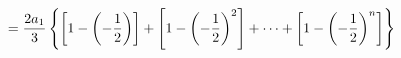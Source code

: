 \documentclass[preview]{standalone}
\begin{document}
\begin{align*}
\special{dvisvgm:raw <g id='unique000'>}=\frac{2a_1}{3}\left\{\left[1-\left(-\frac{1}{2}\right)\right]+\left[1-\left(-\frac{1}{2}\right)^2\right]+\cdots+\left[1-\left(-\frac{1}{2}\right)^n\right]\right\}\special{dvisvgm:raw </g>}
\end{align*}
\end{document}
